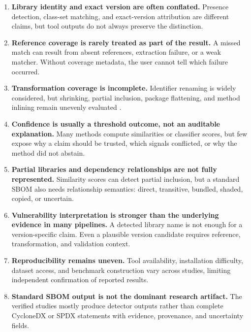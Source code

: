 \begin{enumerate}
  \item \textbf{Library identity and exact version are often conflated.}
  Presence detection, class-set matching, and exact-version attribution are
  different claims, but tool outputs do not always preserve the distinction.

  \item \textbf{Reference coverage is rarely treated as part of the result.}
  A missed match can result from absent references, extraction failure, or a
  weak matcher. Without coverage metadata, the user cannot tell which failure
  occurred.

  \item \textbf{Transformation coverage is incomplete.}
  Identifier renaming is widely considered, but shrinking, partial inclusion,
  package flattening, and method inlining remain unevenly evaluated
  \cite{xie2024libhunter,pan2025libattention,zhou2025sad}.

  \item \textbf{Confidence is usually a threshold outcome, not an auditable
  explanation.}
  Many methods compute similarities or classifier scores, but few expose why
  a claim should be trusted, which signals conflicted, or why the method did
  not abstain.

  \item \textbf{Partial libraries and dependency relationships are not fully
  represented.}
  Similarity scores can detect partial inclusion, but a standard SBOM also
  needs relationship semantics: direct, transitive, bundled, shaded, copied,
  or uncertain.

  \item \textbf{Vulnerability interpretation is stronger than the underlying
  evidence in many pipelines.}
  A detected library name is not enough for a version-specific \CVE claim.
  Even a plausible version candidate requires reference, transformation, and
  validation context.

  \item \textbf{Reproducibility remains uneven.}
  Tool availability, installation difficulty, dataset access, and benchmark
  construction vary across studies, limiting independent confirmation of
  reported results.

  \item \textbf{Standard SBOM output is not the dominant research artifact.}
  The verified studies mostly produce detector outputs rather than complete
  CycloneDX or SPDX statements with evidence, provenance, and uncertainty
  fields.
\end{enumerate}

